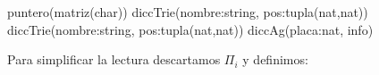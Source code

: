 

				{puntero(matriz(char))} %
		{diccTrie(nombre:string, pos:tupla(nat,nat))} %
	{diccTrie(nombre:string, pos:tupla(nat,nat))} %
		{diccAg(placa:nat, info)} %

Para simplificar la lectura descartamos $\Pi_i$ y definimos:\par
\begin{Tupla}[info]
\end{Tupla}

\begin{Tupla}[NodoSancion]
\end{Tupla}
    